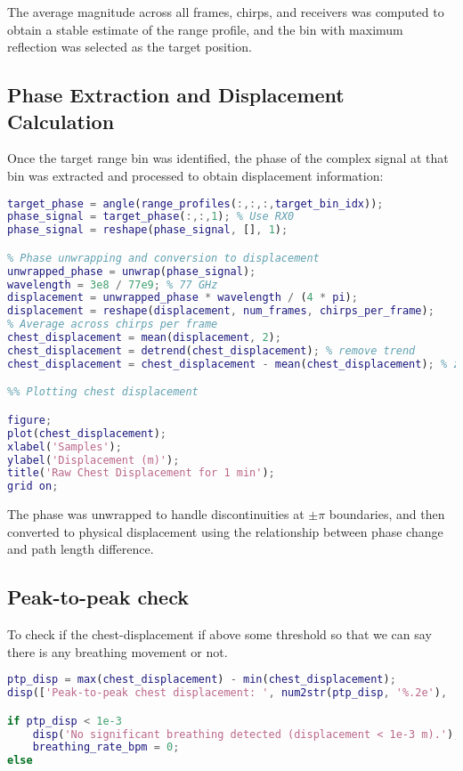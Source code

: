 \documentclass[12pt]{article}
\begin{document}
The average magnitude across all frames, chirps, and receivers was computed to obtain a stable estimate of the range profile, and the bin with maximum reflection was selected as the target position.

\subsection{Phase Extraction and Displacement Calculation}
Once the target range bin was identified, the phase of the complex signal at that bin was extracted and processed to obtain displacement information:

\begin{lstlisting}[language=Matlab]
% Extracting phase at target bin
target_phase = angle(range_profiles(:,:,:,target_bin_idx));
phase_signal = target_phase(:,:,1); % Use RX0
phase_signal = reshape(phase_signal, [], 1);

% Phase unwrapping and conversion to displacement
unwrapped_phase = unwrap(phase_signal);
wavelength = 3e8 / 77e9; % 77 GHz
displacement = unwrapped_phase * wavelength / (4 * pi);
displacement = reshape(displacement, num_frames, chirps_per_frame);
% Average across chirps per frame
chest_displacement = mean(displacement, 2);
chest_displacement = detrend(chest_displacement); % remove trend
chest_displacement = chest_displacement - mean(chest_displacement); % zero mean

%% Plotting chest displacement

figure;
plot(chest_displacement);
xlabel('Samples');
ylabel('Displacement (m)');
title('Raw Chest Displacement for 1 min');
grid on;
\end{lstlisting}

The phase was unwrapped to handle discontinuities at $\pm\pi$ boundaries, and then converted to physical displacement using the relationship between phase change and path length difference.

\subsection{Peak-to-peak check}
To check if the chest-displacement if above some threshold so that we can say there is any breathing movement or not.

\begin{lstlisting}[language=Matlab]
%% Step 5: Peak-to-peak check
ptp_disp = max(chest_displacement) - min(chest_displacement);
disp(['Peak-to-peak chest displacement: ', num2str(ptp_disp, '%.2e'), ' meters']);

if ptp_disp < 1e-3
    disp('No significant breathing detected (displacement < 1e-3 m).');
    breathing_rate_bpm = 0;
else
\end{lstlisting}
\end{document}
